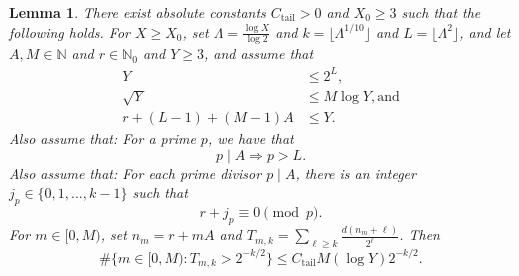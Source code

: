 \documentclass[12pt]{article}
\newtheorem{lemma}{Lemma}%
\begin{document}
\begin{lemma}\label{taillemma}
 There exist absolute constants $C_{\operatorname{tail}} > 0$ and $X_0 \geq 3$ such that the following holds. For $X \geq X_0$, set 
 $\Lambda = \frac{\log X}{\log 2}$ and $k = \lfloor \Lambda^{1/10} \rfloor$
 and $L = \lfloor \Lambda^2 \rfloor$, and let $A, M \in \mathbb{N}$ and 	 $r \in \mathbb{N}_{0}$ and $Y \geq 3$, 
 and assume that 
\begin{align}
 Y & \leq 2^{L}, \label{Yleq2L} \\ 
 \sqrt{Y} & \leq M \log Y, \text{and} \label{sqrtYMlogY} \\ 
 r + (L-1) + (M-1) A & \leq Y. \label{longestassumption} 
\end{align}
 Also assume that: For a prime $p$, we have that 
\begin{equation}\label{ifpmidA}
 p \mid A \Longrightarrow p > L. 
\end{equation}
 Also assume that: For each prime divisor $p \mid A$, there is an integer $ j_p \in \{ 0, 1, \ldots, k-1 \} $ such that 
\begin{equation}\label{jpcongruence} 
 r + j_p \equiv 0 \pmod p. 
\end{equation}
 For 	 $m \in [0, M)$, set $ n_{m} = r + m A $ and $ T_{m, k} = \sum_{\ell \geq k} \frac{d(n_m + \ell)}{2^\ell}$. Then $$ \#\Big\{ m \in [0, 
 M) : T_{m, k} > 2^{-k/2} \Big\} \leq C_{\operatorname{tail}} M (\log Y) 2^{-k/2}.$$
\end{lemma}
\end{document}
